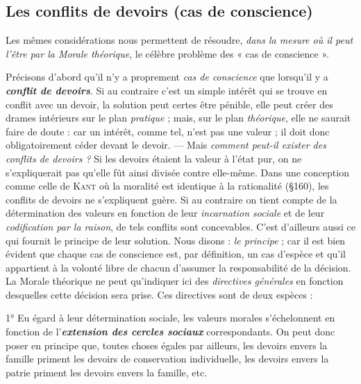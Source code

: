 \subsection{Les conflits de devoirs (cas de conscience)}%
Les mêmes
considérations nous permettent de résoudre, {\it dans la mesure où il
peut l'être par la Morale théorique}, le célèbre problème des « cas de
conscience ».

Précisons d’abord qu’il n’y a proprement {\it cas de conscience} que
lorsqu'il y a \textbf{\textit {conflit de devoirs}}. Si au contraire c’est un simple intérêt
qui se trouve en conflit avec un devoir, la solution peut certes être
pénible, elle peut créer des drames intérieurs sur le plan {\it pratique} ;
mais, sur le plan {\it théorique}, elle ne saurait faire de doute : car un intérêt,
comme tel, n’est pas une valeur ; il doit donc obligatoirement
céder devant le devoir. — Mais {\it comment peut-il exister des conflits de
devoirs ?} Si les devoirs étaient la valeur à l’état pur, on ne s’expliquerait
pas qu’elle fût ainsi divisée contre elle-même. Dans une conception
comme celle de \textsc{Kant} où la moralité est identique à la rationalité
(\S 160), les conflits de devoirs ne s’expliquent guère. Si au contraire
on tient compte de la détermination des valeurs en fonction de
leur {\it incarnation sociale} et de leur {\it codification par la raison}, de tels
conflits sont concevables. C’est d’ailleurs aussi ce qui fournit le principe
de leur solution. Nous disons : {\it le principe} ; car il est bien évident
que chaque cas de conscience est, par définition, un cas d’espèce
et qu’il appartient à la volonté libre de chacun d’assumer la responsabilité
de la décision. La Morale théorique ne peut qu’indiquer ici des
{\it directives générales} en fonction desquelles cette décision sera prise.
Ces directives sont de deux espèces :

1° Eu égard à leur détermination sociale, les valeurs morales
s’échelonnent en fonction de l’\textbf{\textit {extension des cercles sociaux}} correspondants.
On peut donc poser en principe que, toutes choses égales
par ailleurs, les devoirs envers la famille priment les devoirs de conservation
individuelle, les devoirs envers la patrie priment les devoirs
envers la famille, etc.

